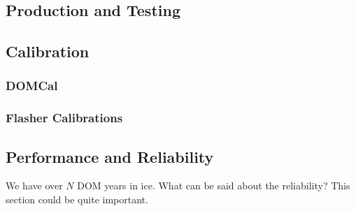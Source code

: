 \subsection{Production and Testing}

\subsection{Calibration}

\subsubsection{DOMCal}

\subsubsection{Flasher Calibrations}

\subsection{Performance and Reliability}
We have over $N$ DOM years in ice.  What can be said about 
the reliability?  This section could be quite important.